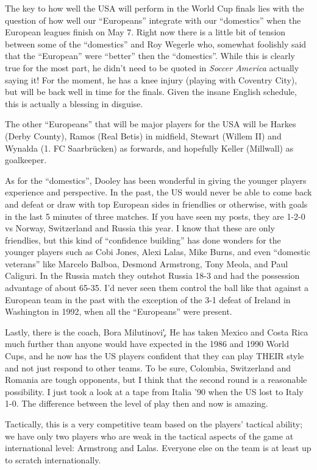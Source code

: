 The key to how well the USA will perform in the World Cup finals lies with the
question of how well our ``Europeans'' integrate with our ``domestics'' when the 
European leagues finish on May 7. Right now there is a little bit of tension 
between some of the ``domestics'' and Roy Wegerle who, somewhat foolishly said 
that the ``European'' were ``better'' then the ``domestics''. While this is clearly
true for the most part, he didn't need to be quoted in \textit{Soccer America} 
actually saying it! For the moment, he has a knee injury (playing with Coventry
City), but will be back well in time for the finals. Given the insane English
schedule, this is actually a blessing in disguise.

The other ``Europeans'' that will be major players for the USA will be Harkes 
(Derby County), Ramos (Real Betis) in midfield, Stewart (Willem II) and Wynalda
(1. FC Saarbr{\"u}cken) as forwards, and hopefully Keller (Millwall) as 
goalkeeper.

As for the ``domestics'', Dooley has been wonderful in giving the younger players
experience and perspective. In the past, the US would never be able to come 
back and defeat or draw with top European sides in friendlies or otherwise,
with goals in the last 5 minutes of three matches. If you have seen my posts, 
they are 1-2-0 vs Norway, Switzerland and Russia this year. I know that these 
are only friendlies, but this kind of ``confidence building'' has done wonders
for the younger players such as Cobi Jones, Alexi Lalas, Mike Burns, and even 
``domestic veterans'' like Marcelo Balboa, Desmond Armstrong, Tony Meola, and 
Paul Caliguri. In the Russia match they outshot Russia 18-3 and had the 
possession advantage of about 65-35. I'd never seen  them control the ball 
like that against a European team in the past with the exception of the 3-1 
defeat of Ireland in Washington in 1992, when all the ``Europeans'' were present.

Lastly, there is the coach, Bora Milutinovi{\c'}. He has taken Mexico and Costa 
Rica much further than anyone would have expected in the 1986 and 1990 World 
Cups, and he now has the US players confident that they can play THEIR style 
and not just respond to other teams. To be sure, Colombia, Switzerland and 
Romania are tough opponents, but I think that the second round is a reasonable
possibility. I just took a look at a tape from Italia '90 when the US lost to 
Italy 1-0. The difference between the level of play then and now is amazing.

Tactically, this is a very competitive team based on the players' tactical
ability; we have only two players who are weak in the tactical aspects of the 
game at international level: Armstrong and Lalas. Everyone else on the team is 
at least up to scratch internationally.

